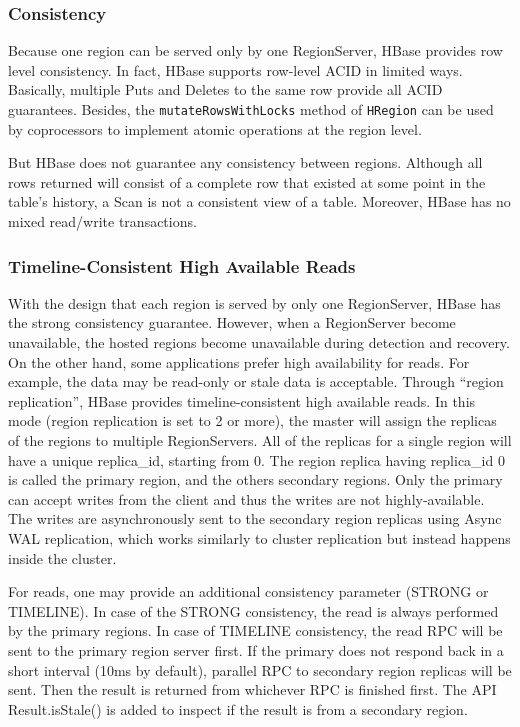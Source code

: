 \documentclass[11pt]{book}
\begin{document}
\subsubsection{Consistency}
Because one region can be served only by one RegionServer, HBase provides row level consistency. In fact, HBase supports row-level ACID in limited ways. Basically, multiple Puts and Deletes to the same row provide all ACID guarantees. Besides, the \texttt{mutateRowsWithLocks} method of \texttt{HRegion} can be used by coprocessors to implement atomic operations at the region level.

But HBase does not guarantee any consistency between regions. Although all rows returned will consist of a complete row that existed at some point in the table's history, a Scan is not a consistent view of a table. Moreover,  HBase has no mixed read/write transactions.

\subsubsection{Timeline-Consistent High Available Reads}
With the design that each region is served by only one RegionServer, HBase has the strong consistency guarantee. However, when a RegionServer become unavailable, the hosted regions become unavailable during detection and recovery. On the other hand, some applications prefer high availability for reads. For example, the data may be read-only or stale data is acceptable. Through ``region replication'', HBase provides timeline-consistent high available reads. In this mode (region replication is set to 2 or more), the master will assign the replicas of the regions to multiple RegionServers.  All of the replicas for a single region will have a unique replica\_id, starting from 0. The region replica having replica\_id 0 is called the primary region, and the others secondary regions. Only the primary can accept writes from the client and thus the writes are not highly-available. The writes are asynchronously sent to the secondary region replicas using Async WAL replication, which works similarly to cluster replication but instead happens inside the cluster.

For reads, one may provide an additional consistency parameter (STRONG or TIMELINE). In case of the STRONG consistency, the read is always performed by the primary regions. In case of TIMELINE consistency, the read RPC will be sent to the primary region server first. If the primary does not respond back in a short interval (10ms by default), parallel RPC to secondary region replicas will be sent. Then the result is returned from whichever RPC is finished first. The API Result.isStale() is added to inspect if the result is from a secondary region.
\end{document}

